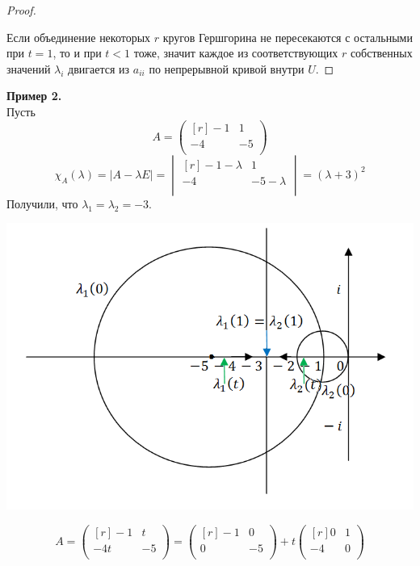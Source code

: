 \documentclass[12pt]{article}
\begin{document}
\begin{proof}
\begin{center}
	\end{center}
	Если объединение некоторых $r$ кругов Гершгорина не пересекаются с остальными при $t=1$, то и при $t<1$ тоже, значит каждое из соответствующих $r$ собственных значений $\lambda_i$ двигается из $a_{ii}$ по непрерывной кривой внутри $U.$
	\end{proof}
	\textbf{Пример 2.}\\
	Пусть 
	\[A=\begin{pmatrix}[r]
	-1 & 1 \\
	-4 & -5 \\
	\end{pmatrix}\]
	\[\chi_A(\lambda)=|A-\lambda E|=\begin{vmatrix}[r]
	-1-\lambda & 1 \\
	-4 & -5-\lambda \\
	\end{vmatrix}=(\lambda +3)^2\]
	Получили, что $\lambda_1=\lambda_2=-3$.
	\begin{center}
		\includegraphics[scale=0.8]{l9_5.png}
	\end{center}
	\[A=\begin{pmatrix}[r]
	-1 & t \\
	-4t & -5 \\
	\end{pmatrix}=\begin{pmatrix}[r]
	-1 & 0 \\
	0 & -5 \\
	\end{pmatrix}+ t\begin{pmatrix}[r]
	0 & 1 \\
	-4 & 0 \\
	\end{pmatrix}\]
\end{document}

